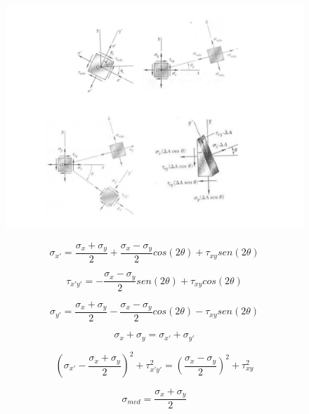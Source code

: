 \documentclass[a4paper]{article}
\begin{document}
		\begin{figure}[!htb]
			\includegraphics[scale = 0.4]{imagem1}
		\end{figure}	

		\begin{equation}
			\label{sigma_x'}
			\sigma_{x'} = \frac{\sigma_x + \sigma_y}{2} + \frac{\sigma_x - \sigma_y}{2}cos(2 \theta) + \tau_{xy}sen(2\theta)
		\end{equation}

		\begin{equation}
			\label{tau_xy'}	
			\tau_{x'y'} = -\frac{\sigma_x - \sigma_y}{2}sen(2 \theta) + \tau_{xy}cos(2\theta)
		\end{equation}

		\begin{equation}
			\label{sigma_y'}
			\sigma_{y'} = \frac{\sigma_x + \sigma_y}{2} - \frac{\sigma_x - \sigma_y}{2}cos(2 \theta) - \tau_{xy}sen(2\theta)
		\end{equation}

		\begin{equation}
			\sigma_x + \sigma_y = \sigma_{x'} + \sigma_{y'}
		\end{equation}

		\begin{equation}
			(\sigma_{x'} - \frac{\sigma_x + \sigma_y}{2})^2 + \tau_{x'y'}^2 = (\frac{\sigma_x - \sigma_y}{2})^2 + \tau_{xy}^2
		\end{equation}

		\begin{equation}
			\sigma_{med} = \frac{\sigma_x + \sigma_y}{2} 
		\end{equation}
\end{document}
